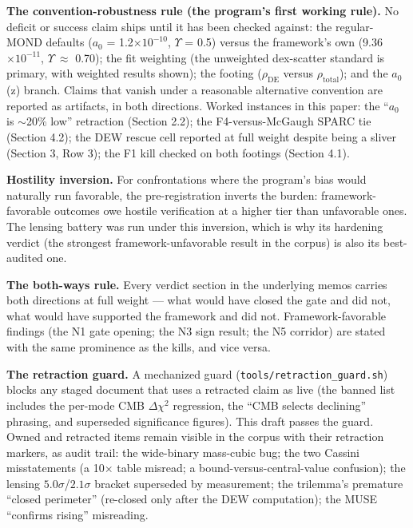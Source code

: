 \documentclass[11pt,a4paper]{article}
\begin{document}
\textbf{The convention-robustness rule (the program's first working rule).} No deficit or success claim ships until it has been checked against: the regular-MOND defaults ($a_{0}$ = 1.2$\times10^{-10}$, $\Upsilon$ = 0.5) versus the framework's own (9.36$\times10^{-11}$, $\Upsilon\ \approx$ 0.70); the fit weighting (the unweighted dex-scatter standard is primary, with weighted results shown); the footing ($\rho_{\mathrm{DE}}$ versus $\rho_{\mathrm{total}}$); and the $a_{0}$(z) branch. Claims that vanish under a reasonable alternative convention are reported as artifacts, in both directions. Worked instances in this paper: the ``$a_{0}$ is $\sim$20\% low'' retraction (Section 2.2); the F4-versus-McGaugh SPARC tie (Section 4.2); the DEW rescue cell reported at full weight despite being a sliver (Section 3, Row 3); the F1 kill checked on both footings (Section 4.1).

\textbf{Hostility inversion.} For confrontations where the program's bias would naturally run favorable, the pre-registration inverts the burden: framework-favorable outcomes owe hostile verification at a higher tier than unfavorable ones. The lensing battery was run under this inversion, which is why its hardening verdict (the strongest framework-unfavorable result in the corpus) is also its best-audited one.

\textbf{The both-ways rule.} Every verdict section in the underlying memos carries both directions at full weight --- what would have closed the gate and did not, what would have supported the framework and did not. Framework-favorable findings (the N1 gate opening; the N3 sign result; the N5 corridor) are stated with the same prominence as the kills, and vice versa.

\textbf{The retraction guard.} A mechanized guard (\texttt{tools/\allowbreak{}retraction\_\allowbreak{}guard.sh}) blocks any staged document that uses a retracted claim as live (the banned list includes the per-mode CMB $\Delta\chi^2$ regression, the ``CMB selects declining'' phrasing, and superseded significance figures). This draft passes the guard. Owned and retracted items remain visible in the corpus with their retraction markers, as audit trail: the wide-binary mass-cubic bug; the two Cassini misstatements (a 10$\times$ table misread; a bound-versus-central-value confusion); the lensing $5.0\sigma$/$2.1\sigma$ bracket superseded by measurement; the trilemma's premature ``closed perimeter'' (re-closed only after the DEW computation); the MUSE ``confirms rising'' misreading.
\end{document}
